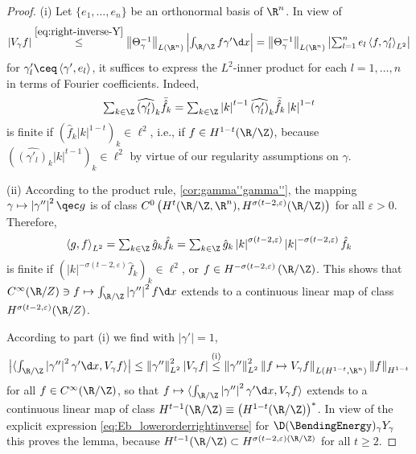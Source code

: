 \begin{proof}
    \textrm{(i)}  Let $ \{ e_1,\dots,e_n\} $ be an orthonormal basis of $ \R^n $. In view of 
    \begin{align*}\textstyle
        \left|V_{\gamma}f \right|\overset{\cref{eq:right-inverse-Y}}{\le}\left\|\Theta^{-1}_{\gamma} \right\|_{L(\R^n)}\left|\int_{\R/\Z}f\gamma'\d x \right|=\left\|\Theta^{-1}_{\gamma} \right\|_{L(\R^n)}\left|\sum_{l=1}^ne_l \left\langle f,\gamma'_l \right\rangle_{L^2}  \right|
    \end{align*}
    for $ \gamma'_l\ceq \left\langle \gamma',e_l \right\rangle  $, it suffices to express the $ L^2 $-inner product for each $ l=1,\dots,n $ in terms of Fourier coefficients. Indeed, 
    \begin{align*}\textstyle
        \sum_{k\in\Z}\widehat{(\gamma'_{l})}_{k}\bar{\hat{f}}_{k}=\sum_{k\in\Z}\left|k \right|^{t-1}\widehat{(\gamma'_{l})}_{k}\bar{\hat{f}}_{k}\left|k \right|^{1-t}
    \end{align*}
    is finite if $ (\hat{f}_{k}\left|k \right|^{1-t} )_{k}\in \ell^2$, i.e., if $ f\in H^{1-t}(\R/\Z) $, because $ (\widehat{(\gamma'_{l})}_{k}\left|k \right|^{t-1} )_{k}\in \ell^2 $ by virtue of our regularity assumptions on $ \gamma $. 

    \textrm{(ii)}  According to the product rule, \cref{cor:gamma''gamma''}, the mapping $ \gamma\mapsto\left|\gamma''  \right|^2\qec g $ is of class $ C^0\left( H^{t}(\R/\Z,\R^n),H^{\sigma(t-2,\varepsilon)}(\R/\Z) \right) $ for all $ \varepsilon>0 $. 
    Therefore,  
    \begin{align*}\textstyle
        \left\langle g,f \right\rangle_{L^2} =\sum_{k\in\Z}\hat{g}_{k}\hat{f}_{k}=\sum_{k\in\Z}\hat{g}_{k}\left|k \right|^{\sigma(t-2,\varepsilon)}\left|k \right|^{-\sigma(t-2,\varepsilon)}\hat{f}_{k}
    \end{align*}
    is finite if $ (\left|k \right|^{-\sigma(t-2,\varepsilon)}\hat{f}_{k})_{k}\in \ell^2 $, or $ f\in H^{-\sigma(t-2,\varepsilon)}\left( \R/\Z \right) $. This shows that $ C^\infty(\R/Z)\ni f\mapsto\int_{\R/\Z}\left|\gamma'' \right|^2 f\d x $ extends to a continuous linear map of class $ H^{\sigma(t-2,\varepsilon)}(\R/Z) $.
    
    
    According to part \textrm{(i)} we find with $ \left|\gamma' \right|=1 $, 
    \begin{align*}\textstyle
      \big|\langle \int_{\R/\Z}\left|\gamma'' \right|^2\gamma'\d x, V_{\gamma}f \rangle  \big|\le \left\|\gamma'' \right\|^2_{L^2}\left|V_{\gamma}f \right|\overset{\textrm{(i)}}{\le}\left\|\gamma'' \right\|^2_{L^2}\left\|f\mapsto V_{\gamma}f \right\|_{L(H^{1-t},\R^n)}\left\|f \right\|_{H^{1-t}}
    \end{align*}
    for all $ f\in C^\infty(\R/\Z) $, so that $ f\mapsto \langle \int_{\R/\Z}\left|\gamma'' \right|^2\gamma'\d x, V_{\gamma}f \rangle $ extends to a continuous linear map of class $ H^{t-1}(\R/\Z)\equiv \left( H^{1-t}(\R/\Z) \right)^* $. 
    In view of the explicit expression \cref{eq:Eb_lowerorderrightinverse} for $ \D(\BendingEnergy)_{\gamma}Y_\gamma $ this proves the lemma, because $ H^{t-1}(\R/\Z)\subset H^{\sigma(t-2,\varepsilon)(\R/\Z)} $ for all $ t\ge 2 $.
\end{proof}

